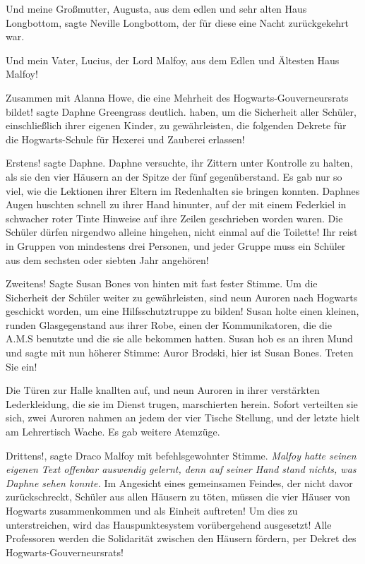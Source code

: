 \glqq{}Und meine Großmutter, Augusta, aus dem edlen und sehr alten Haus
Longbottom\grqq{}, sagte Neville Longbottom, der für diese eine Nacht
zurückgekehrt war.

\glqq{}Und mein Vater, Lucius, der Lord Malfoy, aus dem Edlen und Ältesten Haus
Malfoy!\grqq{}

\glqq{}Zusammen mit Alanna Howe, die eine Mehrheit des Hogwarts-Gouverneursrats
bildet!\grqq{} sagte Daphne Greengrass deutlich. \glqq{}haben, um die Sicherheit
aller Schüler, einschließlich ihrer eigenen Kinder, zu gewährleisten, die
folgenden Dekrete für die Hogwarts-Schule für Hexerei und Zauberei
erlassen!\grqq{}

\glqq{}Erstens!\grqq{} sagte Daphne. Daphne versuchte, ihr Zittern unter
Kontrolle zu halten, als sie den vier Häusern an der Spitze der fünf
gegenüberstand. Es gab nur so viel, wie die Lektionen ihrer Eltern im
Redenhalten sie bringen konnten. Daphnes Augen huschten schnell zu ihrer Hand
hinunter, auf der mit einem Federkiel in schwacher roter Tinte Hinweise auf ihre
Zeilen geschrieben worden waren. \glqq{}Die Schüler dürfen nirgendwo alleine
hingehen, nicht einmal auf die Toilette! Ihr reist in Gruppen von mindestens
drei Personen, und jeder Gruppe muss ein Schüler aus dem sechsten oder siebten
Jahr angehören!\grqq{}

\glqq{}Zweitens!\grqq{} Sagte Susan Bones von hinten mit fast fester Stimme.
\glqq{}Um die Sicherheit der Schüler weiter zu gewährleisten, sind neun Auroren
nach Hogwarts geschickt worden, um eine Hilfsschutztruppe zu bilden!\grqq{}
Susan holte einen kleinen, runden Glasgegenstand aus ihrer Robe, einen der
Kommunikatoren, die die A.M.S benutzte und die sie alle bekommen hatten. Susan
hob es an ihren Mund und sagte mit nun höherer Stimme: \glqq{}Auror Brodski, hier
ist Susan Bones. Treten Sie ein!\grqq{}

Die Türen zur Halle knallten auf, und neun Auroren in ihrer verstärkten
Lederkleidung, die sie im Dienst trugen, marschierten herein. Sofort verteilten
sie sich, zwei Auroren nahmen an jedem der vier Tische Stellung, und der letzte
hielt am Lehrertisch Wache. Es gab weitere Atemzüge.

\glqq{}Drittens!\grqq{}, sagte Draco Malfoy mit befehlsgewohnter Stimme.
\emph{Malfoy hatte seinen eigenen Text offenbar auswendig gelernt, denn auf
seiner Hand stand nichts, was Daphne sehen konnte.} \glqq{}Im Angesicht eines
gemeinsamen Feindes, der nicht davor zurückschreckt, Schüler aus allen Häusern
zu töten, müssen die vier Häuser von Hogwarts zusammenkommen und als Einheit
auftreten! Um dies zu unterstreichen, wird das Hauspunktesystem vorübergehend
ausgesetzt! Alle Professoren werden die Solidarität zwischen den Häusern
fördern, per Dekret des Hogwarts-Gouverneursrats!\grqq{}

